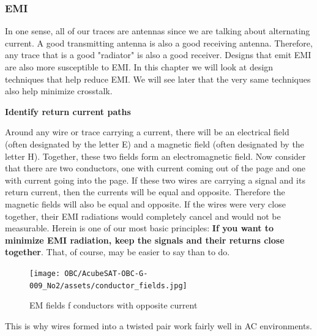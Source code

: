 \documentclass[final]{cubedoc}
\begin{document}
	\subsubsection{EMI}
	
	In one sense, all of our traces are antennas since we are talking about alternating current. A good transmitting antenna is also a good receiving antenna. Therefore, any trace that is a good "radiator" is also a good receiver. Designs that emit EMI are also more susceptible to EMI. In this chapter we will look at design techniques that help reduce EMI. We will see later that the very same techniques also help minimize crosstalk.
	
	\textbf{Identify return current paths}
	
	Around any wire or trace carrying a current, there will be an electrical field (often designated by the letter E) and a magnetic field (often designated by the letter H). Together, these two fields form an electromagnetic field. Now consider that there are two conductors, one with current coming out of the page and one with current going into the page. If these two wires are carrying a signal and its return current, then the currents will be equal and opposite. Therefore the magnetic fields will also be equal and opposite. If the wires were very close together, their EMI radiations would completely cancel and would not be measurable. Herein is one of our most basic principles: \textbf{If you want to minimize EMI radiation, keep the signals and their returns close together}. That, of course, may be easier to say than to do.
	
	\begin{figure}[h!]
		\centering
		\texttt{[image: OBC/AcubeSAT-OBC-G-009\_No2/assets/conductor\_fields.jpg]}
		\caption{EM fields f conductors with opposite current}
		\label{fig:my_label}
	\end{figure}
	
	This is why wires formed into a twisted pair work fairly well in AC environments.
	
\end{document}
